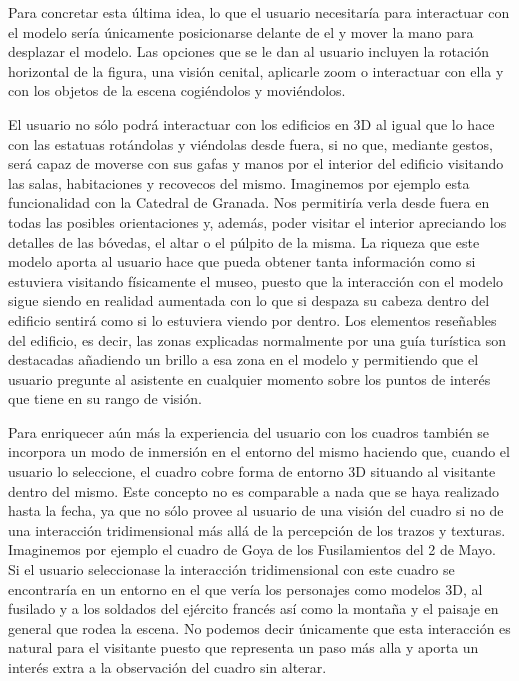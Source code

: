\documentclass[a4paper,11pt]{article}
\begin{document}
Para concretar esta última idea, lo que el usuario necesitaría para interactuar con el modelo sería únicamente posicionarse delante de el y mover la mano para desplazar el modelo. Las opciones que se le dan al usuario incluyen la rotación horizontal de la figura, una visión cenital, aplicarle zoom o interactuar con ella y con los objetos de la escena cogiéndolos y moviéndolos.

El usuario no sólo podrá interactuar con los edificios en 3D al igual que lo hace con las estatuas rotándolas y viéndolas desde fuera, si no que, mediante gestos, será capaz de moverse con sus gafas y manos por el interior del edificio visitando las salas, habitaciones y recovecos del mismo. Imaginemos por ejemplo esta funcionalidad con la Catedral de Granada. Nos permitiría verla desde fuera en todas las posibles orientaciones y, además, poder visitar el interior apreciando los detalles de las bóvedas, el altar o el púlpito de la misma. La riqueza que este modelo aporta al usuario hace que pueda obtener tanta información como si estuviera visitando físicamente el museo, puesto que la interacción con el modelo sigue siendo en realidad aumentada con lo que si despaza su cabeza dentro del edificio sentirá como si lo estuviera viendo por dentro. Los elementos reseñables del edificio, es decir, las zonas explicadas normalmente por una guía turística son destacadas añadiendo un brillo a esa zona en el modelo y permitiendo que el usuario pregunte al asistente en cualquier momento sobre los puntos de interés que tiene en su rango de visión.

Para enriquecer aún más la experiencia del usuario con los cuadros también se incorpora un modo de inmersión en el entorno del mismo haciendo que, cuando el usuario lo seleccione, el cuadro cobre forma de entorno 3D situando al visitante dentro del mismo. Este concepto no es comparable a nada que se haya realizado hasta la fecha, ya que no sólo provee al usuario de una visión del cuadro si no de una interacción tridimensional más allá de la percepción de los trazos y texturas. Imaginemos por ejemplo el cuadro de Goya de los Fusilamientos del 2 de Mayo. Si el usuario seleccionase la interacción tridimensional con este cuadro se encontraría en un entorno en el que vería los personajes como modelos 3D, al fusilado y a los soldados del ejército francés así como la montaña y el paisaje en general que rodea la escena. No podemos decir únicamente que esta interacción es natural para el visitante puesto que representa un paso más alla y aporta un interés extra a la observación del cuadro sin alterar.
\end{document}
